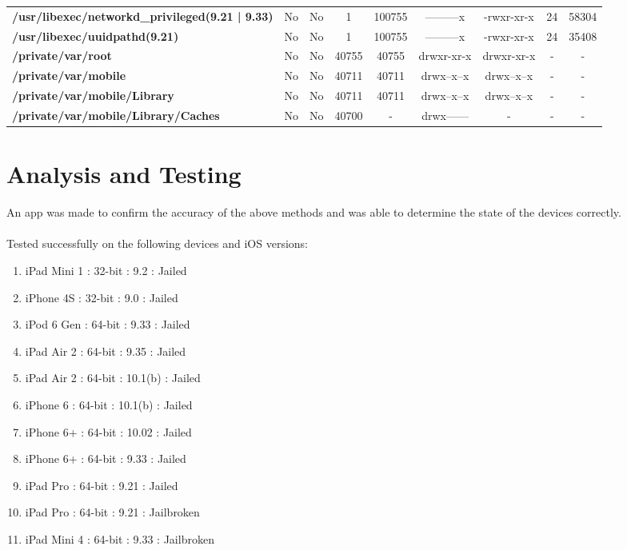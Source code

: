\begin{center}
{\begin{tabular}{|>{\bfseries} l | C | C | C | C | C | C | C | C |}
					/usr/libexec/networkd\_privileged(9.21 | 9.33) & No & No & \color{green}1 & \color{red}100755 & \color{green}---------x & \color{red}-rwxr-xr-x & \color{green}24 & \color{red}58304\\ 
					/usr/libexec/uuidpathd(9.21) & No & No & \color{green}1 & \color{red}100755 & \color{green}---------x & \color{red}-rwxr-xr-x & \color{green}24 & \color{red}35408\\ 
					/private/var/root & No & No & 40755 & 40755 & drwxr-xr-x & drwxr-xr-x & - & -\\ 
					/private/var/mobile & No & No & 40711 & 40711 & drwx--x--x & drwx--x--x & - & -\\ 
					/private/var/mobile/Library & No & No & 40711 & 40711 & drwx--x--x & drwx--x--x & - & -\\ 
					/private/var/mobile/Library/Caches & No & No & 40700 & - & drwx------ & - & - & -\\ 

			\end{tabular}
		}
	\end{center}

\newpage
\section{Analysis and Testing}
\vspace{20px}
An app was made to confirm the accuracy of the above methods and was able to determine the state of the devices correctly.\\\\
Tested successfully on the following devices and iOS versions:

\begin{enumerate}
	\item iPad Mini 1	:	32-bit	:	9.2		: 	Jailed
	\item iPhone 4S		:	32-bit	:	9.0		: 	Jailed
	\item iPod 6 Gen		:	64-bit	:	9.33		: 	Jailed
	\item iPad Air 2		:	64-bit	:	9.35		: 	Jailed
	\item iPad Air 2		:	64-bit	:	10.1(b)	: 	Jailed
	\item iPhone 6		:	64-bit	:	10.1(b)	: 	Jailed
	\item iPhone 6+		:	64-bit	:	10.02	: 	Jailed
	\item iPhone 6+   	:	64-bit	:	9.33		:	Jailed
	\item iPad Pro    	:	64-bit	:	9.21		:	Jailed
	\item iPad Pro    	:	64-bit	:	9.21		:	Jailbroken
	\item iPad Mini 4 	:	64-bit	:	9.33		: 	Jailbroken
\end{enumerate}



